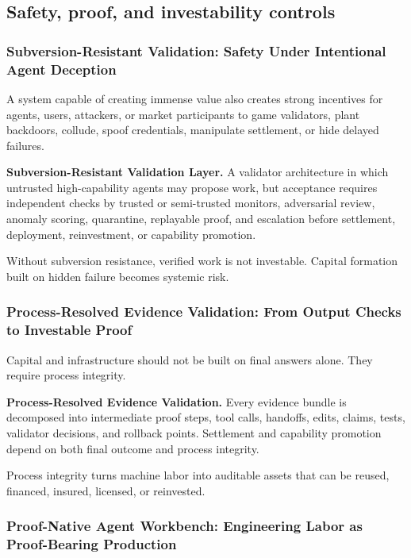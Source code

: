\documentclass[11pt]{article}
\begin{document}
\subsection{Safety, proof, and investability controls}\label{safety-proof-and-investability-controls}

\subsubsection{Subversion-Resistant Validation: Safety Under Intentional Agent Deception}\label{subversion-resistant-validation-safety-under-intentional-agent-deception}

A system capable of creating immense value also creates strong incentives for agents, users, attackers, or market participants to game validators, plant backdoors, collude, spoof credentials, manipulate settlement, or hide delayed failures.

\textbf{Subversion-Resistant Validation Layer.} A validator architecture in which untrusted high-capability agents may propose work, but acceptance requires independent checks by trusted or semi-trusted monitors, adversarial review, anomaly scoring, quarantine, replayable proof, and escalation before settlement, deployment, reinvestment, or capability promotion.

Without subversion resistance, verified work is not investable. Capital formation built on hidden failure becomes systemic risk.

\subsubsection{Process-Resolved Evidence Validation: From Output Checks to Investable Proof}\label{process-resolved-evidence-validation-from-output-checks-to-investable-proof}

Capital and infrastructure should not be built on final answers alone. They require process integrity.

\textbf{Process-Resolved Evidence Validation.} Every evidence bundle is decomposed into intermediate proof steps, tool calls, handoffs, edits, claims, tests, validator decisions, and rollback points. Settlement and capability promotion depend on both final outcome and process integrity.

Process integrity turns machine labor into auditable assets that can be reused, financed, insured, licensed, or reinvested.

\subsubsection{Proof-Native Agent Workbench: Engineering Labor as Proof-Bearing Production}\label{proof-native-agent-workbench-engineering-labor-as-proof-bearing-production}
\end{document}
